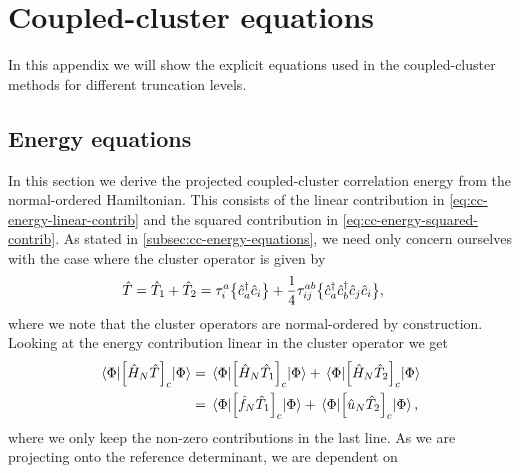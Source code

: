 \chapter{Coupled-cluster equations}
    In this appendix we will show the explicit equations used in the
    coupled-cluster methods for different truncation levels.

    \section{Energy equations}
        \label{app:cc-energy-equations}
        In this section we derive the projected coupled-cluster correlation
        energy from the normal-ordered Hamiltonian.
        This consists of the linear contribution in
        \autoref{eq:cc-energy-linear-contrib} and the squared contribution in
        \autoref{eq:cc-energy-squared-contrib}.
        As stated in \autoref{subsec:cc-energy-equations}, we need only concern
        ourselves with the case where the cluster operator is given by
        \begin{align}
            \hat{T}
            &= \hat{T}_1 + \hat{T}_2
            = \tau^{a}_{i}\bigl\{ \hat{c}_{a}^{\dagger}\hat{c}_{i} \bigr\}
            + \frac{1}{4}\tau^{ab}_{ij}
            \bigl\{ \hat{c}_{a}^{\dagger}\hat{c}_{b}^{\dagger}\hat{c}_{j}\hat{c}_{i} \bigr\},
        \end{align}
        where we note that the cluster operators are normal-ordered by
        construction.
        Looking at the energy contribution linear in the cluster operator we get
        \begin{align}
            \mel{\Phi}{
                \left[ 
                    \hat{H}_N
                    \hat{T}\right]_c
            }{\Phi}
            &=
            \mel{\Phi}{
                \left[ 
                    \hat{H}_N
                    \hat{T}_1
                 \right]_c
            }{\Phi}
            + \mel{\Phi}{
                \left[ 
                    \hat{H}_N
                    \hat{T}_2
                 \right]_c
            }{\Phi}
            \\
            &=
            \mel{\Phi}{
                \left[ 
                    \hat{f}_N
                    \hat{T}_1
                 \right]_c
            }{\Phi}
            + \mel{\Phi}{
                \left[ 
                    \hat{u}_N
                    \hat{T}_2
                 \right]_c
            }{\Phi},
        \end{align}
        where we only keep the non-zero contributions in the last line.
        As we are projecting onto the reference determinant, we are dependent on
